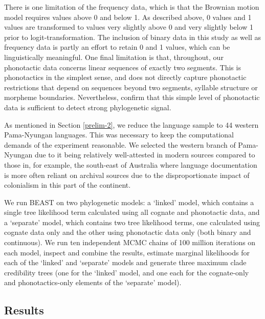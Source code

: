 There is one limitation of the frequency data, which is that the Brownian motion model requires values above 0 and below 1. As described above, 0 values and 1 values are transformed to values very slightly above 0 and very slightly below 1 prior to logit-transformation. The inclusion of binary data in this study as well as frequency data is partly an effort to retain 0 and 1 values, which can be linguistically meaningful. One final limitation is that, throughout, our phonotactic data concerns linear sequences of exactly two segments. This is phonotactics in the simplest sense, and does not directly capture phonotactic restrictions that depend on sequences beyond two segments, syllable structure or morpheme boundaries. Nevertheless, \textcite{macklin-cordes_phylogenetic_2020} confirm that this simple level of phonotactic data is sufficient to detect strong phylogenetic signal.

As mentioned in Section \ref{prelim-2}, we reduce the language sample to 44 western Pama-Nyungan languages. This was necessary to keep the computational demands of the experiment reasonable. We selected the western branch of Pama-Nyungan due to it being relatively well-attested in modern sources compared to those in, for example, the south-east of Australia where language documentation is more often reliant on archival sources due to the disproportionate impact of colonialism in this part of the continent.

We run BEAST on two phylogenetic models: a `linked' model, which contains a single tree likelihood term calculated using all cognate and phonotactic data, and a `separate' model, which contains two tree likelihood terms, one calculated using cognate data only and the other using phonotactic data only (both binary and continuous). We run ten independent MCMC chains of 100 million iterations on each model, inspect and combine the results, estimate marginal likelihoods for each of the `linked' and `separate' models and generate three maximum clade credibility trees (one for the `linked' model, and one each for the cognate-only and phonotactics-only elements of the `separate' model).

\hypertarget{main-results}{%
\subsection{Results}\label{main-results}}


